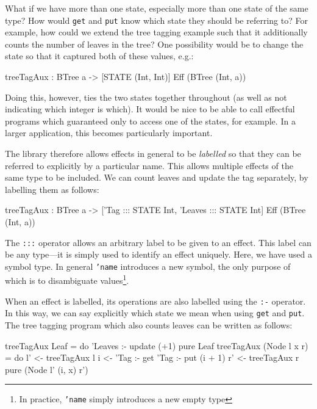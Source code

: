 What if we have more than one state, especially more than one state of the
same type? How would \texttt{get} and \texttt{put}
know which state they should be referring to? For example, how could we
extend the tree tagging example such that it additionally counts the number
of leaves in the tree?
%
One possibility would be to change the state so that it captured both of
these values, e.g.:

\begin{code}
treeTagAux : BTree a
           -> { [STATE (Int, Int)] } Eff (BTree (Int, a))
\end{code}

\noindent
Doing this, however, ties the two states together throughout (as well as
not indicating which integer is which). It would be nice to be able to
call effectful programs which guaranteed only to access one of the states,
for example. In a larger application, this becomes particularly important.

The \effects{} library therefore allows effects in general to be
\emph{labelled} so that they can be referred to explicitly by a particular
name. This allows multiple effects of the same type to be included. We can
count leaves and update the tag separately, by labelling them as follows:

\begin{code}
treeTagAux : BTree a
           -> {['Tag ::: STATE Int,
                'Leaves ::: STATE Int]} Eff (BTree (Int, a))
\end{code}

\noindent
The \texttt{:::} operator allows an arbitrary label to be given to an effect.
This label can be any type---it is simply used to identify an effect uniquely.
Here, we have used a symbol type. In general \texttt{'name} introduces a
new symbol, the only purpose of which is to disambiguate values\footnote{In
practice, \texttt{'name} simply introduces a new empty type}.

When an effect is labelled, its operations are also labelled using the
\texttt{:-} operator. In this way, we can say explicitly which state we mean
when using \texttt{get} and \texttt{put}. The tree tagging program which also
counts leaves can be written as follows:

\begin{code}
treeTagAux Leaf = do
    'Leaves :- update (+1)
    pure Leaf
treeTagAux (Node l x r) = do
    l' <- treeTagAux l
    i <- 'Tag :- get
    'Tag :- put (i + 1)
    r' <- treeTagAux r
    pure (Node l' (i, x) r')
\end{code}

